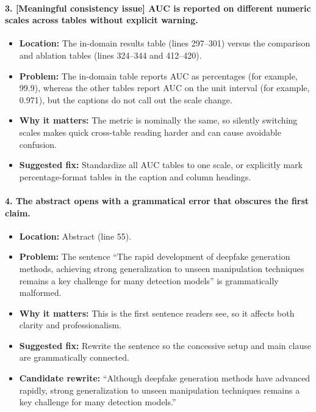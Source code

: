 \documentclass[11pt]{article}
\begin{document}
\paragraph{3. [Meaningful consistency issue] AUC is reported on different numeric scales across tables without explicit warning.}
\begin{itemize}
    \item \textbf{Location:} The in-domain results table (lines 297--301) versus the comparison and ablation tables (lines 324--344 and 412--420).
    \item \textbf{Problem:} The in-domain table reports AUC as percentages (for example, 99.9), whereas the other tables report AUC on the unit interval (for example, 0.971), but the captions do not call out the scale change.
    \item \textbf{Why it matters:} The metric is nominally the same, so silently switching scales makes quick cross-table reading harder and can cause avoidable confusion.
    \item \textbf{Suggested fix:} Standardize all AUC tables to one scale, or explicitly mark percentage-format tables in the caption and column headings.
\end{itemize}

\paragraph{4. The abstract opens with a grammatical error that obscures the first claim.}
\begin{itemize}
    \item \textbf{Location:} Abstract (line 55).
    \item \textbf{Problem:} The sentence ``The rapid development of deepfake generation methods, achieving strong generalization to unseen manipulation techniques remains a key challenge for many detection models'' is grammatically malformed.
    \item \textbf{Why it matters:} This is the first sentence readers see, so it affects both clarity and professionalism.
    \item \textbf{Suggested fix:} Rewrite the sentence so the concessive setup and main clause are grammatically connected.
    \item \textbf{Candidate rewrite:} ``Although deepfake generation methods have advanced rapidly, strong generalization to unseen manipulation techniques remains a key challenge for many detection models.''
\end{itemize}
\end{document}
